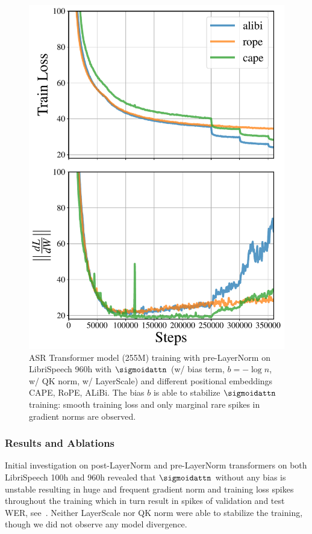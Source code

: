 \begin{figure}[ht]
  \begin{minipage}{0.58\textwidth}
    \centering
    \includegraphics[width=0.6\linewidth]{figures/asr_appendix_pos_embed}
  \end{minipage}%
  \hfill
  \begin{minipage}{0.4\textwidth}
    \caption{ASR Transformer model (255M) training with pre-LayerNorm on LibriSpeech 960h with $\sigmoidattn$ (w/ bias term, $b=-\log n$, w/ QK norm, w/ LayerScale) and different positional embeddings CAPE, RoPE, ALiBi. The bias $b$ is able to stabilize $\sigmoidattn$ training: smooth training loss and only marginal rare spikes in gradient norms are observed.}    
    \label{fig:asr-logn}
  \end{minipage}  
\end{figure}

    

\subsubsection{Results and Ablations}
\label{sec:asr_appendix_ablations_and_results}
Initial investigation on post-LayerNorm and pre-LayerNorm transformers on both LibriSpeech 100h and 960h revealed that $\sigmoidattn$ without any bias is unstable resulting in huge and frequent gradient norm and training loss spikes throughout the training which in turn result in spikes of validation and test WER, see~. Neither LayerScale nor QK norm were able to stabilize the training, though we did not observe any model divergence.

